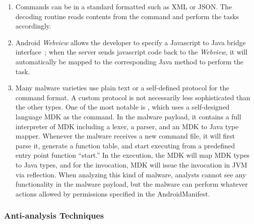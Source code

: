 \begin{enumerate}[label=\alph*)]
\item Commands can be in a standard formatted such as XML or JSON.
The decoding routine reads contents from
the command and perform the tasks accordingly.
\item Android {\em Webview} allows the developer to specify
a Javascript to Java bridge interface~\cite{webview};
when the server sends javascript code back to the {\em Webview},
it will automatically be mapped to the corresponding Java
method to perform the task.
\item Many malware varieties use plain text or
a self-defined protocol for the command format.
A custom protocol is not necessarily less sophisticated
than the other types.
One of the most notable is ,
which uses a self-designed language MDK as
the command. In the malware payload, it contains
a full interpreter of MDK including a lexer, a parser,
and an MDK to Java type mapper.
Whenever the malware receives a new command file, it will
first parse it, generate a function table, and start executing
from a predefined entry point function ``start.''
In the execution, the MDK will map MDK types to Java types,
and for the invocation, MDK will issue the invocation
in JVM via reflection.
When analyzing this kind of malware, analysts cannot see any
functionality in the malware payload, but the malware can perform
whatever actions allowed by permissions specified in the AndroidManifest.
\end{enumerate}

\vspace{-.1in}
\subsubsection{Anti-analysis Techniques}
\label{sec:profile:behavior:anti}

